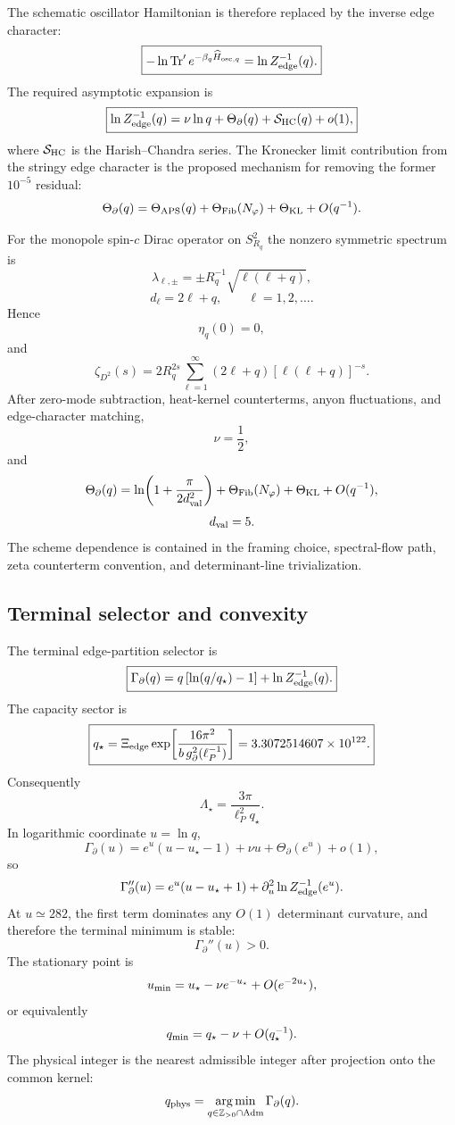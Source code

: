 \documentclass[aps,prd,reprint,nofootinbib,superscriptaddress,floatfix]{revtex4-2}
\numberwithin{equation}{section}
\theoremstyle{definition}
\theoremstyle{plain}
\begin{document}
The schematic oscillator Hamiltonian is therefore replaced by the inverse
edge character:
\[
\boxed{
-\ln\operatorname{Tr}'e^{-\beta_q\widehat H_{{\rm osc},q}}
=
\ln Z_{\rm edge}^{-1}(q).
}
\]
The required asymptotic expansion is
\[
\boxed{
\ln Z_{\rm edge}^{-1}(q)
=
\nu\ln q+\Theta_\partial(q)
+\mathcal S_{\rm HC}(q)+o(1),
}
\]
where \(\mathcal S_{\rm HC}\) is the Harish--Chandra series.  The Kronecker
limit contribution from the stringy edge character is the proposed mechanism
for removing the former \(10^{-5}\) residual:
\[
\Theta_\partial(q)
=
\Theta_{\rm APS}(q)
+\Theta_{\rm Fib}(N_\varphi)
+\Theta_{\rm KL}
+O(q^{-1}).
\]

For the monopole spin-\(c\) Dirac operator on \(S^2_{R_q}\) the nonzero
symmetric spectrum is
\[
\lambda_{\ell,\pm}
=
\pm R_q^{-1}\sqrt{\ell(\ell+q)},
\]
\[
d_\ell=2\ell+q,\qquad \ell=1,2,\ldots .
\]
Hence
\[
\eta_q(0)=0,
\]
and
\[
\zeta_{D^2}(s)
=
2R_q^{2s}
\sum_{\ell=1}^{\infty}
(2\ell+q)[\ell(\ell+q)]^{-s}.
\]
After zero-mode subtraction, heat-kernel counterterms, anyon fluctuations, and
edge-character matching,
\[
\nu=\frac12,
\]
and
\[
\Theta_\partial(q)
=
\ln\!\left(1+\frac{\pi}{2d_{\rm val}^2}\right)
+\Theta_{\rm Fib}(N_\varphi)
+\Theta_{\rm KL}
+O(q^{-1}),
\]
\[
d_{\rm val}=5.
\]
The scheme dependence is contained in the framing choice, spectral-flow path,
zeta counterterm convention, and determinant-line trivialization.

\subsection{Terminal selector and convexity}

The terminal edge-partition selector is
\[
\boxed{
\Gamma_\partial(q)
=
q\left[\ln(q/q_\star)-1\right]
+
\ln Z_{\rm edge}^{-1}(q).
}
\]
The capacity sector is
\[
\boxed{
q_\star
=
\Xi_{\rm edge}
\exp\!\left[
\frac{16\pi^2}{b\,g_\partial^2(\ell_P^{-1})}
\right]
=
3.3072514607\times10^{122}.
}
\]
Consequently
\[
\boxed{
\Lambda_\star
=
\frac{3\pi}{\ell_P^2 q_\star}.
}
\]
In logarithmic coordinate \(u=\ln q\),
\[
\Gamma_\partial(u)
=
e^u(u-u_\star-1)+\nu u+\Theta_\partial(e^u)+o(1),
\]
so
\[
\Gamma_\partial''(u)
=
e^u(u-u_\star+1)
+\partial_u^2\ln Z_{\rm edge}^{-1}(e^u).
\]
At \(u\simeq282\), the first term dominates any \(O(1)\) determinant curvature,
and therefore the terminal minimum is stable:
\[
\Gamma_\partial''(u)>0 .
\]
The stationary point is
\[
u_{\rm min}
=
u_\star-\nu e^{-u_\star}+O(e^{-2u_\star}),
\]
or equivalently
\[
q_{\rm min}=q_\star-\nu+O(q_\star^{-1}).
\]
The physical integer is the nearest admissible integer after projection onto
the common kernel:
\[
q_{\rm phys}
=
\operatorname*{arg\,min}_{q\in\mathbb Z_{>0}\cap{\rm Adm}}
\Gamma_\partial(q).
\]
\end{document}
